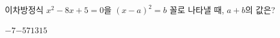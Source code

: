 이차방정식 $x^2-8x+5=0$을 $(x-a)^2=b$ 꼴로 나타낼 때, $a+b$의 값은? 
\begin{choices32}{$-7$}{$-5$}{$7$}{$13$}{$15$}\end{choices32}
